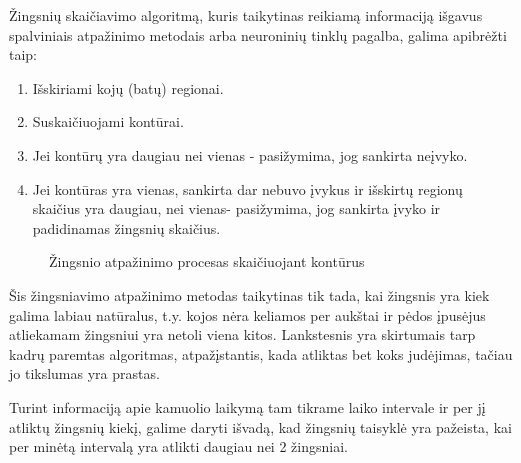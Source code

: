 \documentclass{VUMIFPSbakalaurinis}
\begin{document}
Žingsnių skaičiavimo algoritmą, kuris taikytinas reikiamą informaciją išgavus spalviniais atpažinimo metodais arba neuroninių tinklų pagalba, galima apibrėžti taip:

\begin{enumerate}
	\item Išskiriami kojų (batų) regionai.
	\item Suskaičiuojami kontūrai.
	\item Jei kontūrų yra daugiau nei vienas - pasižymima, jog sankirta neįvyko. 
	\item Jei kontūras yra vienas, sankirta dar nebuvo įvykus ir išskirtų regionų skaičius yra daugiau, nei vienas- pasižymima, jog sankirta įvyko ir padidinamas žingsnių skaičius. 
\end{enumerate}

\begin{figure}[H]
	\centering
	\qquad
	\qquad
	\caption{Žingsnio atpažinimo procesas skaičiuojant kontūrus}
	\label{fig:hand_and_ball}
\end{figure}

Šis žingsniavimo atpažinimo metodas taikytinas tik tada, kai žingsnis yra kiek galima labiau natūralus, t.y. kojos nėra keliamos per aukštai ir pėdos įpusėjus atliekamam žingsniui yra netoli viena kitos. Lankstesnis yra skirtumais tarp kadrų paremtas algoritmas, atpažįstantis, kada atliktas bet koks judėjimas, tačiau jo tikslumas yra prastas.

Turint informaciją apie kamuolio laikymą tam tikrame laiko intervale ir per jį atliktų žingsnių kiekį, galime daryti išvadą, kad žingsnių taisyklė yra pažeista, kai per minėtą intervalą yra atlikti daugiau nei 2 žingsniai. 
\end{document}
